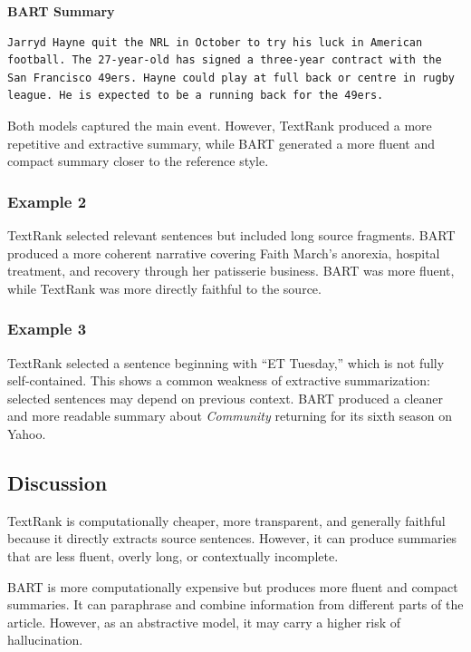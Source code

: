 \documentclass[11pt,a4paper]{article}
\begin{document}
\textbf{BART Summary}

\begin{lstlisting}
Jarryd Hayne quit the NRL in October to try his luck in American football. The 27-year-old has signed a three-year contract with the San Francisco 49ers. Hayne could play at full back or centre in rugby league. He is expected to be a running back for the 49ers.
\end{lstlisting}

Both models captured the main event. However, TextRank produced a more repetitive and extractive summary, while BART generated a more fluent and compact summary closer to the reference style.

\subsubsection{Example 2}

TextRank selected relevant sentences but included long source fragments. BART produced a more coherent narrative covering Faith March's anorexia, hospital treatment, and recovery through her patisserie business. BART was more fluent, while TextRank was more directly faithful to the source.

\subsubsection{Example 3}

TextRank selected a sentence beginning with ``ET Tuesday,'' which is not fully self-contained. This shows a common weakness of extractive summarization: selected sentences may depend on previous context. BART produced a cleaner and more readable summary about \textit{Community} returning for its sixth season on Yahoo.

\subsection{Discussion}

TextRank is computationally cheaper, more transparent, and generally faithful because it directly extracts source sentences. However, it can produce summaries that are less fluent, overly long, or contextually incomplete.

BART is more computationally expensive but produces more fluent and compact summaries. It can paraphrase and combine information from different parts of the article. However, as an abstractive model, it may carry a higher risk of hallucination.
\end{document}
